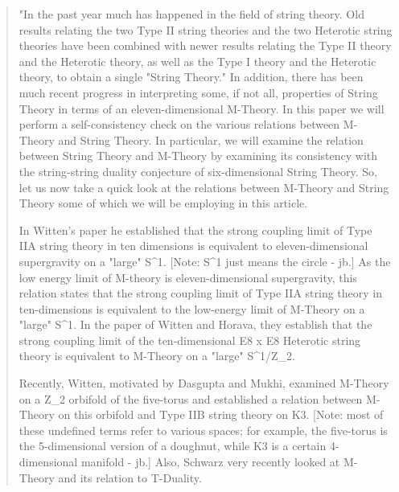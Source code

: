 \begin{quote}
"In the past year much has happened in the field of string theory.
Old results relating the two Type II string theories and the
two Heterotic string theories have been combined with newer
results relating the Type II theory and the Heterotic theory, 
as well as the Type I theory and the Heterotic theory, 
to obtain a single "String Theory."  In addition, there has been much
recent progress in interpreting some, if not all, properties of String
Theory in terms of an eleven-dimensional M-Theory. 
In this paper we will perform a 
self-consistency check on the various relations between M-Theory and
String Theory. In particular, we will examine the relation between String
Theory and M-Theory by examining its consistency with the string-string
duality conjecture of six-dimensional String Theory. So, let us now take a
quick look at the relations between M-Theory and String Theory some of
which we will be employing in this article.

In Witten's paper he established that the strong coupling
limit of Type IIA string theory in ten dimensions is equivalent to
eleven-dimensional supergravity on a "large" S^1.
[Note: S^1 just means the circle - jb.]  As the low energy limit of
M-theory is eleven-dimensional supergravity, this relation
states that the strong coupling limit of Type IIA string theory in
ten-dimensions is equivalent to the low-energy limit of M-Theory on a
"large" S^1. In the paper of Witten and Horava, they
establish that the strong coupling limit of the ten-dimensional E8 x E8
Heterotic string theory is equivalent to M-Theory on a 
"large" S^1/Z_2.

Recently, Witten, motivated by Dasgupta and Mukhi,
examined M-Theory on a Z_2 orbifold of the five-torus and
established a relation between M-Theory on this orbifold and Type IIB
string theory on K3.  [Note: most of these undefined terms refer to
various spaces; for example, the five-torus is the 5-dimensional version
of a doughnut, while K3 is a certain 4-dimensional manifold - jb.]  Also,
Schwarz very recently looked at M-Theory and its relation to
T-Duality.


\end{quote}
